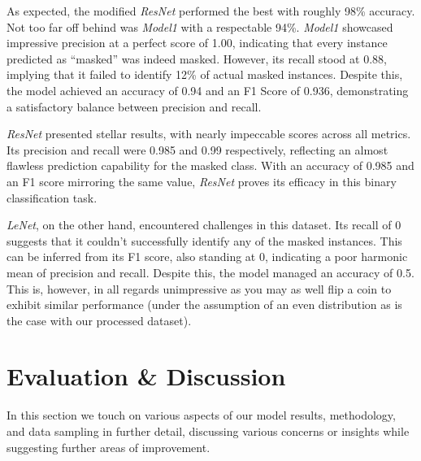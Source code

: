 \documentclass{article}
\begin{document}
\begin{figure}[h!]
  \begin{floatrow}
  \end{floatrow}
\hrulefill
  \begin{floatrow}
  \end{floatrow}
\end{figure}

As expected, the modified \textit{ResNet} performed the best with roughly 98\% accuracy. Not too far off behind was \textit{Model1} with a respectable 94\%. \textit{Model1} showcased impressive precision at a perfect score of 1.00, indicating that every instance predicted as \enquote{masked} was indeed masked. However, its recall stood at 0.88, implying that it failed to identify 12\% of actual masked instances. Despite this, the model achieved an accuracy of 0.94 and an F1 Score of 0.936, demonstrating a satisfactory balance between precision and recall.

\textit{ResNet} presented stellar results, with nearly impeccable scores across all metrics. Its precision and recall were 0.985 and 0.99 respectively, reflecting an almost flawless prediction capability for the masked class. With an accuracy of 0.985 and an F1 score mirroring the same value, \textit{ResNet} proves its efficacy in this binary classification task.

\textit{LeNet}, on the other hand, encountered challenges in this dataset. Its recall of 0 suggests that it couldn't successfully identify any of the masked instances. This can be inferred from its F1 score, also standing at 0, indicating a poor harmonic mean of precision and recall. Despite this, the model managed an accuracy of 0.5. This is, however, in all regards unimpressive as you may as well flip a coin to exhibit similar performance (under the assumption of an even distribution as is the case with our processed dataset).


\section{Evaluation \& Discussion}
\label{sec:discussion}

In this section we touch on various aspects of our model results, methodology, and data sampling in further detail, discussing various concerns or insights while suggesting further areas of improvement.
\end{document}

